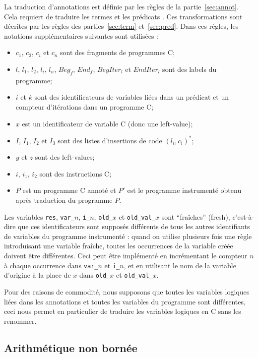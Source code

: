 La traduction d'annotations est définie par les règles de la
partie~\ref{sec:annot}.
Cela requiert de traduire les termes et les prédicats \eacsl.
Ces transformations sont décrites par les règles des parties~\ref{sec:term}
et~\ref{sec:pred}.
Dans ces règles, les notations supplémentaires suivantes sont utilisées :
\begin{itemize}
\item $c_1$, $c_2$, $c_i$ et $c_n$ sont des fragments de programmes C;
\item $l$, $l_1$, $l_2$, $l_i$, $l_n$, $\mathit{Beg_f}$, $\mathit{End_f}$,
  $\mathit{BegIter_l}$ et $\mathit{EndIter_l}$ sont des labels du programme;
\item $i$ et $k$ sont des identificateurs de variables liées
  dans un prédicat \eacsl et un compteur d'itérations dans un programme C;
\item $x$ est un identificateur de variable C (donc une left-value);
\item $I$, $I_1$, $I_2$ et $I_3$ sont des listes d'insertions de code
  $(l_i, c_i)^*$;
\item $y$ et $z$ sont des left-values;
\item $i$, $i_1$, $i_2$ sont des instructions C;
\item $P$ est un programme C annoté et $P'$ est le programme instrumenté
  obtenu après traduction du programme $P$.
\end{itemize}

Les variables \lstinline'res', \lstinline'var_'$n$, \lstinline'i_'$n$,
\lstinline'old_'$x$ et \lstinline'old_val_'$x$ sont
``fraîches'' (fresh), c'est-à-dire que ces identificateurs sont supposés
différents de tous les autres identifiants de variables du programme instrumenté
: quand on utilise plusieurs fois une règle introduisant une variable fraîche,
toutes les occurrences de la variable créée doivent être différentes.
Ceci peut être implémenté en incrémentant le compteur $n$ à chaque
occurrence dans \lstinline'var_'$n$ et \lstinline'i_'$n$, et en utilisant le nom
de la variable d'origine à la place de $x$ dans \lstinline'old_'$x$ et
\lstinline'old_val_'$x$.

Pour des raisons de commodité, nous supposons que toutes les variables logiques
liées dans les annotations et toutes les variables du programme sont
différentes, ceci nous permet en particulier de traduire les variables logiques
en C sans les renommer.


\subsection{Arithmétique non bornée}
\label{sec:integers}


